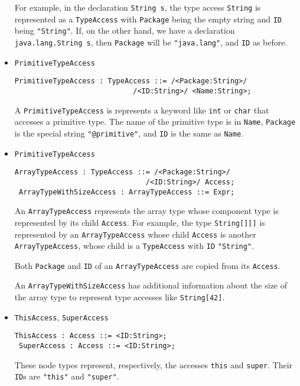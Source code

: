 \documentclass{article}
\newcommand{\nt}[1]{\texttt{#1}}
\newcommand{\child}[1]{\texttt{#1}}
\newcommand{\code}[1]{\lstinline$#1$}
\begin{document}
\begin{itemize}
  For example, in the declaration \code{String s}, the type access
  \code{String} is represented as a \nt{TypeAccess} with \child{Package}
  being the empty string and \child{ID} being \code{"String"}. If, on
  the other hand, we have a declaration \code{java.lang.String s}, then
  \child{Package} will be \code{"java.lang"}, and \child{ID} as before.

\item \nt{PrimitiveTypeAccess}
  \begin{lstlisting}[frame=single]
 PrimitiveTypeAccess : TypeAccess ::= /<Package:String>/ 
                            /<ID:String>/ <Name:String>;
  \end{lstlisting}

  A \nt{PrimitiveTypeAccess} is represents a keyword like \code{int} or 
  \code{char} that accesses a primitive type. The name of the primitive type
  is in \child{Name}, \child{Package} is the special string
  \code{"@primitive"}, and \child{ID} is the same as \child{Name}.

\item \nt{PrimitiveTypeAccess}
  \begin{lstlisting}[frame=single]
 ArrayTypeAccess : TypeAccess ::= /<Package:String>/ 
                               /<ID:String>/ Access;
 ArrayTypeWithSizeAccess : ArrayTypeAccess ::= Expr;
  \end{lstlisting}

  An \nt{ArrayTypeAccess} represents the array type whose component type is
  represented by its child \nt{Access}. For example, the type
  \code{String[][]} is represented by an \nt{ArrayTypeAccess} whose
  child \child{Access} is another \linebreak
  \nt{ArrayTypeAccess}, whose child is
  a \nt{TypeAccess} with \child{ID} \code{"String"}.

  Both \child{Package} and \child{ID} of an \nt{ArrayTypeAccess} are copied
  from its \child{Access}.

  An \nt{ArrayTypeWithSizeAccess} has additional information about the size
  of the array type to represent type accesses like \code{String[42]}.

\item \nt{ThisAccess}, \nt{SuperAccess}
  \begin{lstlisting}[frame=single]
 ThisAccess : Access ::= <ID:String>;
 SuperAccess : Access ::= <ID:String>;
  \end{lstlisting}

  These node types represent, respectively, the accesses \code{this} and
  \code{super}. Their \child{ID}s are \code{"this"} and
  \code{"super"}.


\end{itemize}
\end{document}
